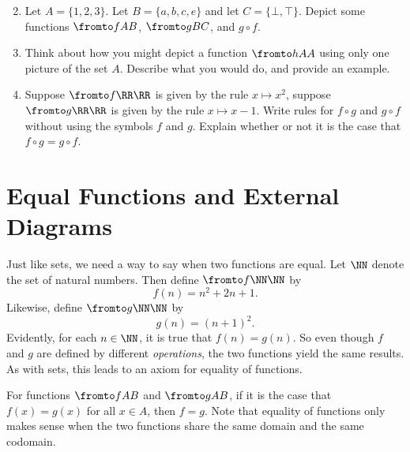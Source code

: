 \begin{exercises}
\begin{enumerate}
\begin{multicols}{2}
\begin{enumerate}
	  \end{enumerate}
	  \end{multicols}
		\item Let $A = \{1,2,3\}$. Let $B=\{a,b,c,e\}$ and let $C = \{\bot,\top\}$.
		Depict some functions $\fromto fAB$, $\fromto gBC$, and $g\circ f$. 
		\item Think about how you might depict a function $\fromto hAA$ using only one picture of the set $A$.
		Describe what you would do, and provide an example.
		\item Suppose $\fromto f\RR\RR$ is given by the rule $x\mapsto x^2$, suppose $\fromto g\RR\RR$ is given
		by the rule $x\mapsto x-1$. Write rules for $f\circ g$ and $g\circ f$ without using the symbols $f$ and $g$. Explain whether or not it is the case that $f\circ g = g\circ f$.
	\end{enumerate}
\end{exercises}

\section*{Equal Functions and External Diagrams}

Just like sets, we need a way to say when two functions are equal.
Let $\NN$ denote the set of natural numbers. 
Then define $\fromto f\NN\NN$ by
\[f(n) = n^2 +  2n + 1.\]
Likewise, define $\fromto g\NN\NN$ by
\[g(n) = (n+1)^2.\]
Evidently, for each $n\in\NN$, it is true that $f(n) = g(n)$.
So even though $f$ and $g$ are defined by different \emph{operations}, the two functions yield the same results.
As with sets, this leads to an axiom for equality of functions.

\begin{axiom}
	For functions $\fromto fAB$ and $\fromto gAB$, if it is the case that $f(x)=g(x)$ for all $x\in A$, then $f=g$.
	Note that equality of functions only makes sense when the two functions share the same domain and the same codomain.
\end{axiom}

